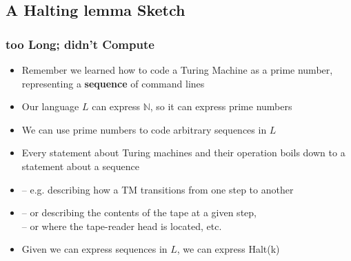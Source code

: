 \subsection{A Halting lemma Sketch}

\begin{frame}
\frametitle{too Long; didn't Compute}

\begin{itemize}[<+->]

\item Remember we learned how to code a Turing Machine as a prime number, representing a \textbf{sequence} of command lines

\item Our language $L$ can express $\mathbb{N}$, so it can express prime numbers

\item We can use prime numbers to code arbitrary sequences in $L$

\item Every statement about Turing machines and their operation boils down to a statement about a sequence
\item[] -- e.g. describing how a TM transitions from one step to another

\item[] -- or describing the contents of the tape at a given step, \\ -- or where the tape-reader head is located, etc. 

\item Given we can express sequences in $L$, we can express \textrm{Halt(k)}



\end{itemize}
\end{frame}

